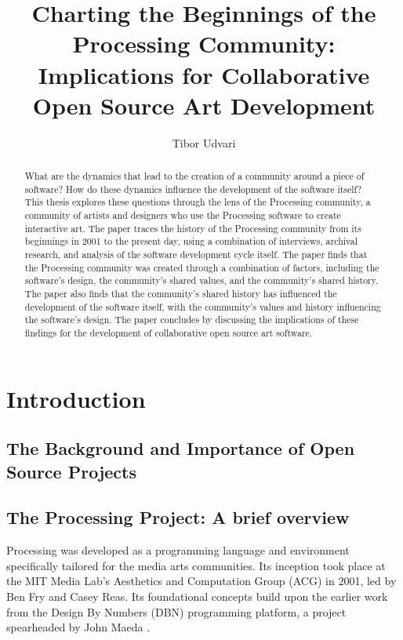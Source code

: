 \documentclass{article}
\title{Charting the Beginnings of the Processing Community: Implications for Collaborative Open Source Art Development}
\author{Tibor Udvari}
\begin{document}
\maketitle

\begin{abstract}
What are the dynamics that lead to the creation of a community around a piece of software? How do these dynamics influence the development of the software itself? This thesis explores these questions through the lens of the Processing community, a community of artists and designers who use the Processing software to create interactive art. The paper traces the history of the Processing community from its beginnings in 2001 to the present day, using a combination of interviews, archival research, and analysis of the software development cycle itself. The paper finds that the Processing community was created through a combination of factors, including the software's design, the community's shared values, and the community's shared history. The paper also finds that the community's shared history has influenced the development of the software itself, with the community's values and history influencing the software's design. The paper concludes by discussing the implications of these findings for the development of collaborative open source art software.
\end{abstract}


\section{Introduction}
\subsection{The Background and Importance of Open Source Projects}

\subsection{The Processing Project: A brief overview}

Processing was developed as a programming language and environment specifically tailored for the media arts communities. Its inception took place at the MIT Media Lab's Aesthetics and Computation Group (ACG) in 2001, led by Ben Fry and Casey Reas. Its foundational concepts build upon the earlier work from the Design By Numbers (DBN) programming platform, a project spearheaded by John Maeda \parencite{fryModernPrometheusHistory2018}.
\end{document}
